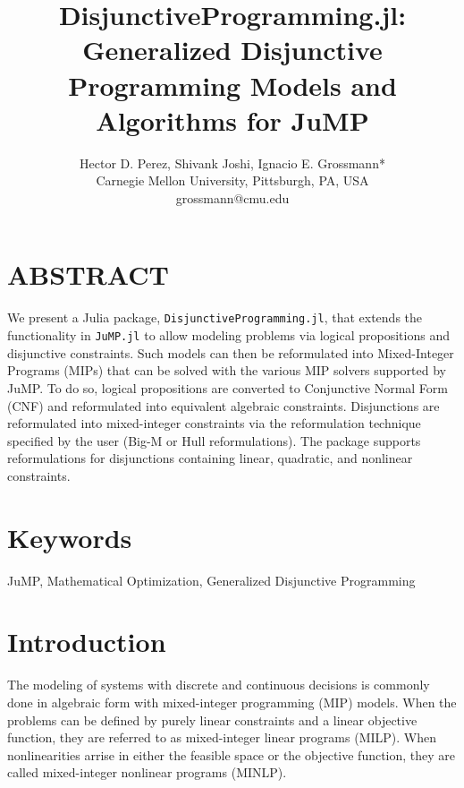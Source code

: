 \documentclass{juliacon}
\begin{document}
\title{DisjunctiveProgramming.jl: Generalized Disjunctive Programming Models and Algorithms for JuMP}
\author{
  \large Hector D. Perez, Shivank Joshi, Ignacio E. Grossmann*
  \\\normalsize Carnegie Mellon University, Pittsburgh, PA, USA  
  \\\normalsize	*grossmann@cmu.edu
}

\maketitle

\section*{ABSTRACT}
We present a Julia package, \verb|DisjunctiveProgramming.jl|, that extends the functionality in \verb|JuMP.jl| to allow modeling problems via logical propositions and disjunctive constraints. Such models can then be reformulated into Mixed-Integer Programs (MIPs) that can be solved with the various MIP solvers supported by JuMP. To do so, logical propositions are converted to Conjunctive Normal Form (CNF) and reformulated into equivalent algebraic constraints. Disjunctions are reformulated into mixed-integer constraints via the reformulation technique specified by the user (Big-M or Hull reformulations). The package supports reformulations for disjunctions containing linear, quadratic, and nonlinear constraints.

\section*{Keywords}
JuMP, Mathematical Optimization, Generalized Disjunctive Programming

\section{Introduction}
The modeling of systems with discrete and continuous decisions is commonly done in algebraic form with mixed-integer programming (MIP) models. When the problems can be defined by purely linear constraints and a linear objective function, they are referred to as mixed-integer linear programs (MILP). When nonlinearities arrise in either the feasible space or the objective function, they are called mixed-integer nonlinear programs (MINLP).
\end{document}
